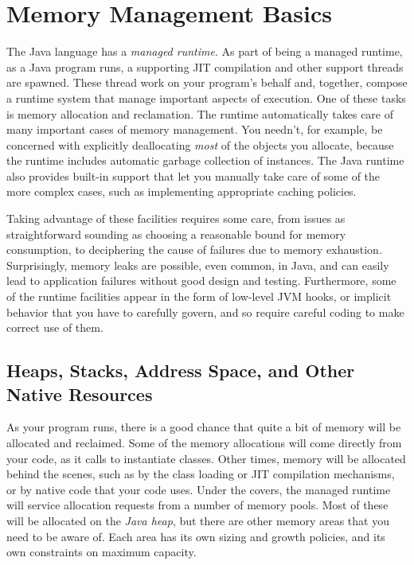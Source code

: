 %
%  


\chapter{Memory Management Basics}

The Java language has a \emph{managed runtime}. As part
of being a managed runtime, as a Java program runs, a supporting JIT compilation
and other support threads are spawned. These thread work on your program's
behalf and, together, compose a runtime system that manage important aspects of
execution. One of these tasks is memory allocation and reclamation. The runtime
automatically takes care of many important cases of memory management. You
needn't, for example, be concerned with explicitly deallocating \emph{most} of
the objects you allocate, because the runtime includes automatic garbage
collection of instances. The Java runtime also provides built-in support that
let you manually take care of some of the more complex cases, such as
implementing appropriate caching policies.

Taking advantage of these facilities requires some care, from issues as
straightforward sounding as choosing a reasonable bound for memory consumption,
to deciphering the cause of failures due to memory exhaustion. Surprisingly,
memory leaks are possible, even common, in Java, and can easily lead to
application failures without good design and testing. Furthermore, some of the
runtime facilities appear in the form of low-level JVM hooks, or implicit
behavior that you have to carefully govern, and so require careful coding to
make correct use of them.

\section{Heaps, Stacks, Address Space, and Other Native Resources}

As your program runs, there is a good chance that quite a bit of memory will be
allocated and reclaimed. Some of the memory allocations will come directly from
your code, as it calls  to instantiate classes. Other times, memory
will be allocated behind the scenes, such as by the class loading or JIT
compilation mechanisms, or by native code that your code uses. Under the covers,
the managed runtime will service allocation requests from a number of memory
pools. Most of these will be allocated on the \emph{Java heap}, but there are
other memory areas that you need to be aware of. Each area has its own sizing
and growth policies, and its own constraints on maximum capacity.

